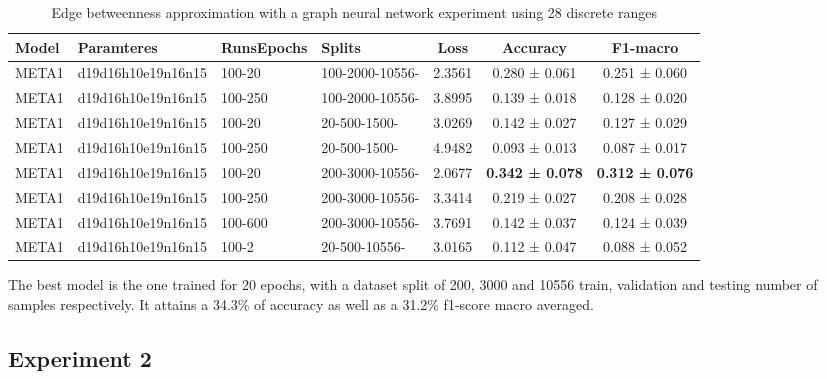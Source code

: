 \begin{appendices}
\begin{table}[H]
\centering
\begin{tabular}{|llllccc|}
\hline
 Model &                                                                          Paramteres  &  Runs\/Epochs  &  Splits &    Loss &        Accuracy &        F1-macro  \\
\hline
 META1 &      d19d16h10e19n16n15 & 100-20 & 100-2000-10556- &  2.3561 &   0.280 ± 0.061 &   0.251 ± 0.060  \\
 META1 &     d19d16h10e19n16n15 & 100-250 & 100-2000-10556- &  3.8995 &   0.139 ± 0.018 &   0.128 ± 0.020  \\
 META1 &         d19d16h10e19n16n15 & 100-20 & 20-500-1500- &  3.0269 &   0.142 ± 0.027 &   0.127 ± 0.029  \\
 META1 &        d19d16h10e19n16n15 & 100-250 & 20-500-1500- &  4.9482 &   0.093 ± 0.013 &   0.087 ± 0.017  \\
 META1 &      d19d16h10e19n16n15 & 100-20 & 200-3000-10556- &  2.0677 &  \textbf{ 0.342 ± 0.078} &   \textbf{0.312 ± 0.076 } \\
 META1 &     d19d16h10e19n16n15 & 100-250 & 200-3000-10556- &  3.3414 &   0.219 ± 0.027 &   0.208 ± 0.028  \\
 META1 &    d19d16h10e19n16n15 & 100-600 & 200-3000-10556- &  3.7691 &   0.142 ± 0.037 &   0.124 ± 0.039  \\
 META1 &    d19d16h10e19n16n15 & 100-2 & 20-500-10556- &  3.0165 &   0.112 ± 0.047 &   0.088 ± 0.052 \\
\hline
\end{tabular}
\label{Experiment1-v2}\caption{Edge betweenness approximation with a graph neural network experiment using 28 discrete ranges}
\end{table} 

The best model is the one trained for 20 epochs, with a dataset split of 200, 3000 and 10556 train, validation and testing number of samples respectively. It attains a 34.3\% of accuracy as well as a 31.2\% f1-score macro averaged. 


\subsection{Experiment 2}






\end{appendices}
